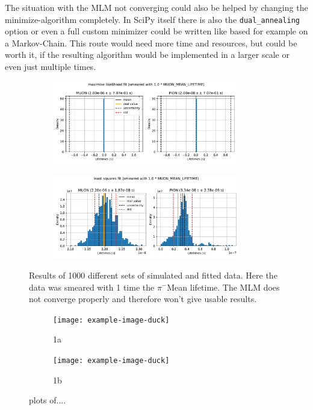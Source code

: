 \documentclass[11pt, a4paper, oneside]{book}
\newcommand\DoublePlotwidth{0.9}
\newcommand{\pion}{$\pi^{-}$}
\begin{document}
The situation with the MLM not converging could also be helped by changing the minimize-algorithm completely. In SciPy itself there is also the \lstinline{dual_annealing} option or even a full custom minimizer could be written like based for example on a Markov-Chain. This route would need more time and resources, but could be worth it, if the resulting algorithm would be implemented in a larger scale or even just multiple times.

\begin{figure}[h]
\begin{subfigure}{\textwidth}
  \centering
  \includegraphics[width=\DoublePlotwidth\textwidth]{images/4b_hist_2_likelihood.pdf}
\end{subfigure}

\begin{subfigure}{\textwidth}
  \centering
  \includegraphics[width=\DoublePlotwidth\textwidth]{images/4b_hist_2_squares.pdf}
\end{subfigure}
\caption{Results of 1000 different sets of simulated and fitted data. Here the data was smeared with 1 time the \pion Mean lifetime. The MLM does not converge properly and therefore won't give usable results.}
\label{fig:results_smeared_2}
\end{figure}

\begin{figure}[h]
\begin{subfigure}{\textwidth}
  \centering
  \texttt{[image: example-image-duck]}
  \caption{1a}
\end{subfigure}

\begin{subfigure}{\textwidth}
  \centering
  \texttt{[image: example-image-duck]}
  \caption{1b}
\end{subfigure}
\caption{plots of....}
\label{fig:fig}
\end{figure}
\end{document}
